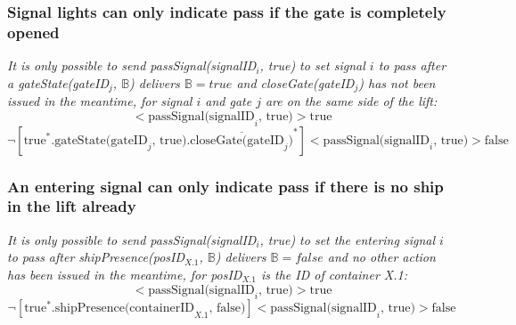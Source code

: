 \subsubsection{Signal lights can only indicate pass if the gate is completely opened}
\textit{It is only possible to send passSignal(signalID$_i$, true) to set signal $i$ to pass after a gateState(gateID$_j$, $ \mathbb{B} $) delivers $\mathbb{B} = true$ and closeGate(gateID$_j$) has not been issued in the meantime, for signal $i$ and gate $j$ are on the same side of the lift:}\\
	\begin{equation*}
		[\textrm{true}^*.\textrm{gateState(gateID}_j\textrm{, true}).\overline{\textrm{closeGate(gateID}_j)}^*]<\textrm{passSignal(signalID}_i \textrm{, true})>\textrm{true}
	\end{equation*}
	\begin{equation*}
		\neg[\textrm{true}^*.\textrm{gateState(gateID}_j\textrm{, true}).\overline{\textrm{closeGate(gateID}_j)}^*]<\textrm{passSignal(signalID}_i \textrm{, true})>\textrm{false}
	\end{equation*}
\subsubsection{An entering signal can only indicate pass if there is no ship in the lift already}
\textit{It is only possible to send passSignal(signalID$_i$, true) to set the entering signal $i$ to pass after shipPresence(posID$_{X.1}$, $\mathbb{B}$) delivers $\mathbb{B} = false$ and no other action has been issued in the meantime, for posID$_{X.1}$ is the ID of container X.1:}\\
	\begin{equation*}
		[\textrm{true}^*.\textrm{shipPresence(containerID}_{X.1} \textrm{, 	false})]<\textrm{passSignal(signalID}_i \textrm{, true})>\textrm{true}
	\end{equation*}
	\begin{equation*}
		\neg[\textrm{true}^*.\textrm{shipPresence(containerID}_{X.1} \textrm{, 	false})]<\textrm{passSignal(signalID}_i \textrm{, true})>\textrm{false}
	\end{equation*}
